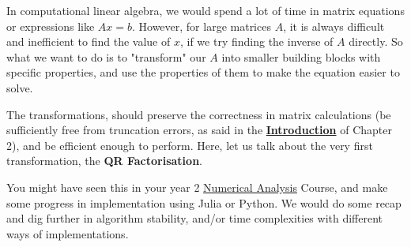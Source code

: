 In computational linear algebra, we would spend a lot of time in matrix equations or expressions like $Ax = b$. However, for large matrices  $A$, it is always difficult and inefficient to find the value of $x$, if we try finding the inverse of $A$ directly. So what we want to do is to "transform" our $A$ into smaller building blocks with specific properties, and use the properties of them to make the equation easier to solve. 

\medskip
\noindent The transformations, should preserve the correctness in matrix calculations (be sufficiently free from truncation errors, as said in the \href{https://comp-lin-alg.github.io/L2_QR_factorisation.html#what-is-the-qr-factorisation}{\textbf{Introduction}} of Chapter 2), and be efficient enough to perform. Here, let us talk about the very first transformation, the \textbf{QR Factorisation}. 
\medskip

\noindent You might have seen this in your year 2 \href{https://github.com/Imperial-MATH50003/MATH50003NumericalAnalysis}{Numerical Analysis} Course, and make some progress in implementation using Julia or Python. We would do some recap and dig further in algorithm stability, and/or time complexities with different ways of implementations.

